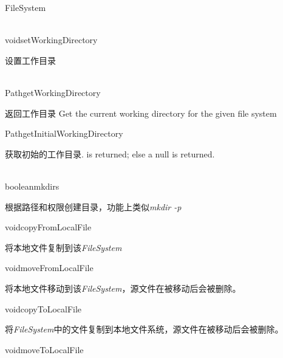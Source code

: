 \begin{XeClass}{FileSystem}
    \begin{XeMethod}{\XePublic \\ \XeAbstract}{void}{setWorkingDirectory}
         
 设置工作目录

    \end{XeMethod}

    \begin{XeMethod}{\XePublic \\ \XeAbstract}{Path}{getWorkingDirectory}
         
 返回工作目录
 Get the current working directory for the given file system

    \end{XeMethod}

    \begin{XeMethod}{\XeProtected}{Path}{getInitialWorkingDirectory}
         
 获取初始的工作目录.
 is returned; else a null is returned.

    \end{XeMethod}

    \begin{XeMethod}{\XePublic \\ \XeAbstract}{boolean}{mkdirs}
         
 根据路径和权限创建目录，功能上类似\emph{mkdir -p}

    \end{XeMethod}

    \begin{XeMethod}{\XePublic}{void}{copyFromLocalFile}
         
 将本地文件复制到该\emph{FileSystem}

    \end{XeMethod}

    \begin{XeMethod}{\XePublic}{void}{moveFromLocalFile}
         
 将本地文件移动到该\emph{FileSystem}，源文件在被移动后会被删除。

    \end{XeMethod}

    \begin{XeMethod}{\XePublic}{void}{copyToLocalFile}
         
 将\emph{FileSystem}中的文件复制到本地文件系统，源文件在被移动后会被删除。

    \end{XeMethod}

    \begin{XeMethod}{\XePublic}{void}{moveToLocalFile}
         

\end{XeMethod}
\end{XeClass}

